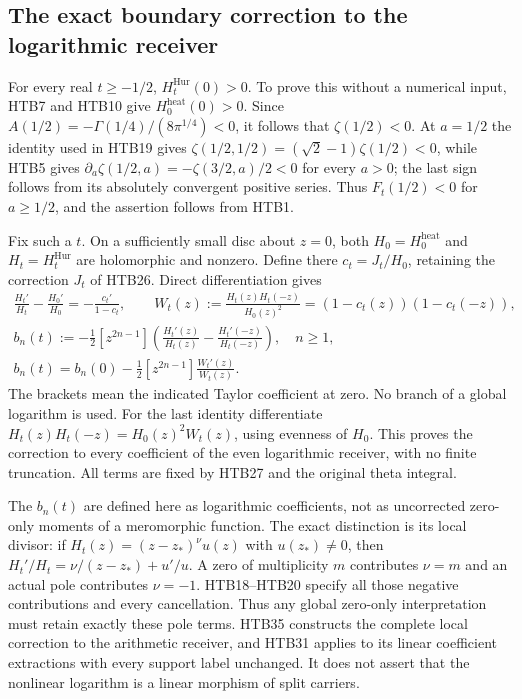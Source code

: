 \documentclass[11pt]{article}
\theoremstyle{definition}
\begin{document}
\subsection{The exact boundary correction to the logarithmic receiver}

For every real $t\ge-1/2$, $H_t^{\mathrm{Hur}}(0)>0$. To prove this
without a numerical input, HTB7 and HTB10 give
$H_0^{\mathrm{heat}}(0)>0$. Since
$A(1/2)=-\Gamma(1/4)/(8\pi^{1/4})<0$, it follows that
$\zeta(1/2)<0$. At $a=1/2$ the identity used in HTB19 gives
$\zeta(1/2,1/2)=(\sqrt2-1)\zeta(1/2)<0$, while HTB5 gives
$\partial_a\zeta(1/2,a)=-\zeta(3/2,a)/2<0$ for every $a>0$;
the last sign follows from its absolutely convergent positive series.
Thus $F_t(1/2)<0$ for $a\ge1/2$, and the assertion follows from HTB1.

Fix such a $t$. On a sufficiently small disc about $z=0$, both
$H_0=H_0^{\mathrm{heat}}$ and $H_t=H_t^{\mathrm{Hur}}$ are
holomorphic and nonzero. Define there $c_t=J_t/H_0$, retaining the
correction $J_t$ of HTB26. Direct differentiation gives
\begin{equation}\tag{HTB35}
\begin{gathered}
 \frac{H_t'}{H_t}-\frac{H_0'}{H_0}
     =-\frac{c_t'}{1-c_t},\qquad
 W_t(z):=\frac{H_t(z)H_t(-z)}{H_0(z)^2}
     =(1-c_t(z))(1-c_t(-z)),\\
 b_n(t):=-\frac12[z^{2n-1}]
       \left(\frac{H_t'(z)}{H_t(z)}-
             \frac{H_t'(-z)}{H_t(-z)}\right),\quad n\ge1,\\
 b_n(t)=b_n(0)-\frac12[z^{2n-1}]\frac{W_t'(z)}{W_t(z)}.
\end{gathered}
\end{equation}
The brackets mean the indicated Taylor coefficient at zero. No branch
of a global logarithm is used. For the last identity differentiate
$H_t(z)H_t(-z)=H_0(z)^2W_t(z)$, using evenness of $H_0$. This proves
the correction to every coefficient of the even logarithmic receiver,
with no finite truncation. All terms are fixed by HTB27 and the
original theta integral.

The $b_n(t)$ are defined here as logarithmic coefficients, not as
uncorrected zero-only moments of a meromorphic function. The exact
distinction is its local divisor: if
$H_t(z)=(z-z_*)^{\nu}u(z)$ with $u(z_*)\ne0$, then
$H_t'/H_t=\nu/(z-z_*)+u'/u$. A zero of multiplicity $m$ contributes
$\nu=m$ and an actual pole contributes $\nu=-1$. HTB18--HTB20 specify
all those negative contributions and every cancellation. Thus any
global zero-only interpretation must retain exactly these pole
terms. HTB35 constructs the complete local correction to the
arithmetic receiver, and HTB31 applies to its linear coefficient
extractions with every support label unchanged. It does not assert
that the nonlinear logarithm is a linear morphism of split carriers.
\end{document}
